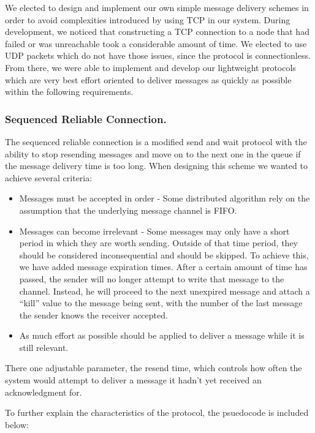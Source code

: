 We elected to design and implement our own simple message delivery schemes in 
order to avoid complexities introduced by using TCP in our system. During 
development, we noticed that constructing a TCP connection to a node that had 
failed or was unreachable took a considerable amount of time. We elected to use 
UDP packets which do not have those issues, since the protocol is 
connectionless. From there, we were able to implement and develop our 
lightweight protocols which are very best effort oriented to deliver messages 
as quickly as possible within the following requirements.

\subsubsection{Sequenced Reliable Connection.}

The sequenced reliable connection is a modified send and wait protocol with the 
ability to stop resending messages and move on to the next one in the queue if 
the message delivery time is too long. When designing this scheme we wanted to 
achieve several criteria:

\begin{itemize}
\item Messages must be accepted in order - Some distributed algorithm rely on 
the assumption that the underlying message channel is FIFO.
\item Messages can become irrelevant - Some messages may only have a short 
period in which they are worth sending. Outside of that time period, they 
should be considered inconsequential and should be skipped. To achieve this, we 
have added message expiration times. After a certain amount of time has passed, 
the sender will no longer attempt to write that message to the channel. 
Instead, he will proceed to the next unexpired message and attach a ``kill'' 
value to the message being sent, with the number of the last message the sender 
knows the receiver accepted.
\item As much effort as possible should be applied to deliver a message while 
it is still relevant.
\end{itemize}

There one adjustable parameter, the resend time, which controls how often the 
system would attempt to deliver a message it hadn't yet received an 
acknowledgment for.

To further explain the characteristics of the protocol, the psuedocode is included below:


